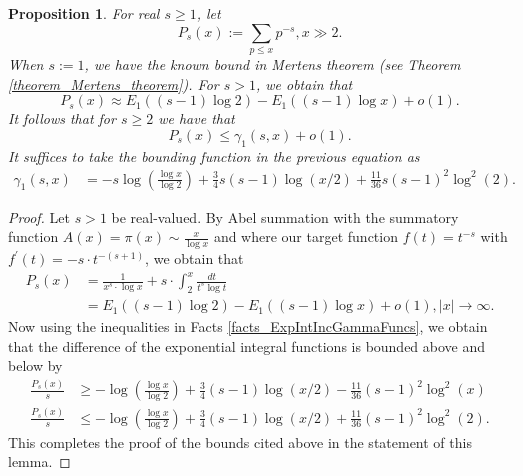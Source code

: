 \documentclass[11pt,reqno,a4letter]{article}
\numberwithin{figure}{section}
\numberwithin{table}{section}
\theoremstyle{plain}
\newtheorem{prop}[theorem]{Proposition}
\numberwithin{theorem}{section}
\theoremstyle{definition}
\newcommand{\NBRef}[1]{}
\begin{document}
\begin{prop} 
\label{cor_PartialSumsOfReciprocalsOfPrimePowers} 
For real $s \geq 1$, let 
\[
P_s(x) := \sum_{p \leq x} p^{-s}, x \gg 2. 
\]
When $s := 1$, we have the known bound in Mertens theorem 
(see Theorem \ref{theorem_Mertens_theorem}). For $s > 1$, we obtain that 
\[
P_s(x) \approx E_1((s-1) \log 2) - E_1((s-1) \log x) + o(1). 
\]
It follows that for $s \geq 2$ we have that 
\[
P_s(x) \leq \gamma_1(s, x) + o(1). 
\]
It suffices to take the bounding function in the previous equation as 
\begin{align*}
\gamma_1(s, x) & = -s\log\left(\frac{\log x}{\log 2}\right) + \frac{3}{4}s(s-1) \log(x/2) + 
     \frac{11}{36} s(s-1)^2 \log^2(2). 
\end{align*}
\end{prop} 
\NBRef{A05-2020-04-26} 
\begin{proof} 
Let $s > 1$ be real-valued. 
By Abel summation with the summatory function $A(x) = \pi(x) \sim \frac{x}{\log x}$ and where 
our target function $f(t) = t^{-s}$ with $f^{\prime}(t) = -s \cdot t^{-(s+1)}$, we obtain that 
\begin{align*} 
P_s(x) & = \frac{1}{x^s \cdot \log x} + s \cdot \int_2^{x} \frac{dt}{t^s \log t} \\ 
     & = E_1((s-1) \log 2) - E_1((s-1) \log x) + o(1), |x| \rightarrow \infty. 
\end{align*} 
Now using the inequalities in Facts \ref{facts_ExpIntIncGammaFuncs}, we obtain that the 
difference of the exponential integral functions is bounded above and below by 
\begin{align*} 
\frac{P_s(x)}{s} & \geq -\log\left(\frac{\log x}{\log 2}\right) + \frac{3}{4}(s-1) \log(x/2) - 
     \frac{11}{36} (s-1)^2 \log^2(x) \\ 
\frac{P_s(x)}{s} & \leq -\log\left(\frac{\log x}{\log 2}\right) + \frac{3}{4}(s-1) \log(x/2) + 
     \frac{11}{36} (s-1)^2 \log^2(2). 
\end{align*} 
This completes the proof of the bounds cited above in the statement of this lemma. 
\end{proof} 
\end{document}
